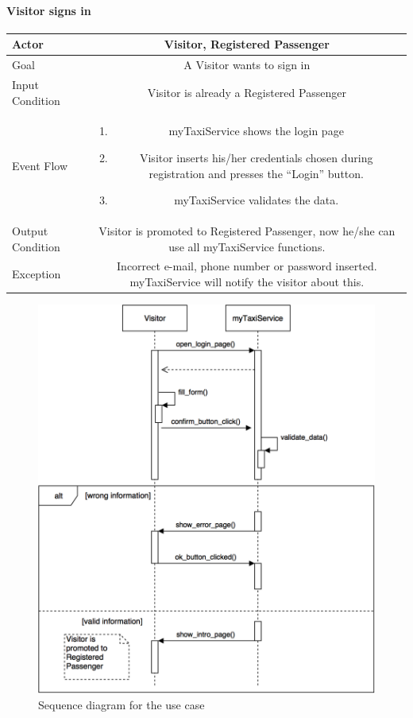 \documentclass[a4paper,12pt,dvipsnames]{article}%
\newcommand{\usecasetable}[6]{
\begin{center}
\def\arraystretch{1.5}
\begin{tabularx}{\textwidth}{|s|C|}
\hline
Actor & #1\\
\hline
Goal & #2\\
\hline
Input Condition & #3 \\
\hline
Event Flow & #4\\
\hline
Output Condition & #5\\
\hline
Exception & #6\\
\hline
\end{tabularx}
\end{center}
}
\begin{document}
\paragraph{Visitor signs in}
\usecasetable {Visitor, Registered Passenger}{A Visitor wants to sign in} {Visitor is already a Registered Passenger} {\begin{minipage}[b]{11cm}
\begin{enumerate}
\item myTaxiService shows the login page
\item Visitor inserts his/her credentials chosen during registration and presses the ``Login'' button.
\item myTaxiService validates the data. 
\end{enumerate}
\end{minipage}
}{Visitor is promoted to Registered Passenger, now he/she can use all myTaxiService functions.}{Incorrect e-mail, phone number or password inserted. myTaxiService will notify the visitor about this.}
\begin{figure}[H]
\centering
\includegraphics[scale=.3]{passenger_login.png}
\caption{Sequence diagram for the use case}
\end{figure}
\break
\end{document}
